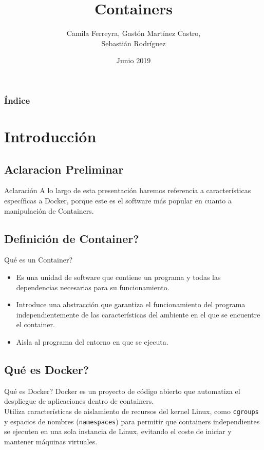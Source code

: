 \documentclass{beamer}
\title{Containers}
\author[Ferreyra, Martínez Castro, S. Rodríguez]{Camila Ferreyra, Gastón Martínez Castro,\\ Sebastián Rodríguez}
\institute
{
  Instituto Politécnico Superior Gral. San Martín
}
\date{Junio 2019}
\begin{document}
\begin{frame}
  \titlepage
\end{frame}

\begin{frame}[allowframebreaks]
  \frametitle{Índice}
  
	\tableofcontents
 

\end{frame}

\section{Introducción}

\subsection{Aclaracion Preliminar}

\begin{frame}{Aclaración}
	A lo largo de esta presentación haremos referencia a características específicas a Docker, porque este es el software más popular en cuanto a manipulación de Containers.
\end{frame}

\subsection{Definición de Container?}

\begin{frame}{Qué es un Container?}

  \begin{itemize}
  \item
    Es una unidad de software que contiene un programa y todas las dependencias necesarias para su funcionamiento.
  \item
   Introduce una abstracción que garantiza el funcionamiento del programa independientemente de las características del ambiente en el que se encuentre el container.
  \item 
  Aisla al programa del entorno en que se ejecuta.
  \end{itemize}
\end{frame}

\subsection{Qué es Docker?}

\begin{frame}{Qué es Docker?}
	\hspace{1cm} Docker es un proyecto de código abierto que automatiza el despliegue de aplicaciones dentro de containers. \\
	\vspace{0.5cm}
	\hspace{1cm} Utiliza características de aislamiento de recursos del kernel Linux, como \texttt{cgroups} y espacios de nombres (\texttt{namespaces}) para permitir que containers independientes se ejecuten en una sola instancia de Linux, evitando el coste de iniciar y mantener máquinas virtuales.
\end{frame}
\end{document}
